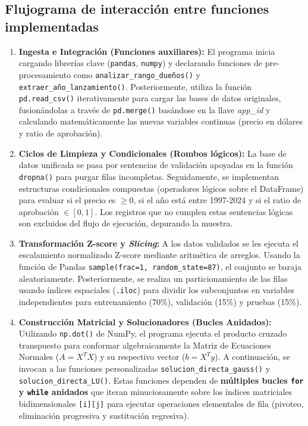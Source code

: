 \documentclass[12pt]{report}
\begin{document}
\subsection*{Flujograma de interacción entre funciones implementadas}

\begin{enumerate}
    \item \textbf{Ingesta e Integración (Funciones auxiliares):} El programa inicia cargando librerías clave (\texttt{pandas}, \texttt{numpy}) y declarando funciones de pre-procesamiento como \texttt{analizar\_rango\_dueños()} y \texttt{extraer\_año\_lanzamiento()}. Posteriormente, utiliza la función \texttt{pd.read\_csv()} iterativamente para cargar las bases de datos originales, fusionándolas a través de \texttt{pd.merge()} basándose en la llave \textit{app\_id} y calculando matemáticamente las nuevas variables continuas (precio en dólares y ratio de aprobación).
    \item \textbf{Ciclos de Limpieza y Condicionales (Rombos lógicos):} La base de datos unificada se pasa por sentencias de validación apoyadas en la función \texttt{dropna()} para purgar filas incompletas. Seguidamente, se implementan estructuras condicionales compuestas (operadores lógicos sobre el DataFrame) para evaluar si el precio es $\geq 0$, si el año está entre 1997-2024 y si el ratio de aprobación $\in [0, 1]$. Los registros que no cumplen estas sentencias lógicas son excluidos del flujo de ejecución, depurando la muestra.
    \item \textbf{Transformación Z-score y \textit{Slicing}:} A los datos validados se les ejecuta el escalamiento normalizado Z-score mediante aritmética de arreglos. Usando la función de Pandas \texttt{sample(frac=1, random\_state=87)}, el conjunto se baraja aleatoriamente. Posteriormente, se realiza un particionamiento de las filas usando índices espaciales (\texttt{.iloc}) para dividir los subconjuntos en variables independientes para entrenamiento (70\%), validación (15\%) y pruebas (15\%).
    \item \textbf{Construcción Matricial y Solucionadores (Bucles Anidados):} Utilizando \texttt{np.dot()} de NumPy, el programa ejecuta el producto cruzado transpuesto para conformar algebraicamente la Matriz de Ecuaciones Normales ($A = X^T X$) y su respectivo vector ($b = X^T y$). A continuación, se invocan a las funciones personalizadas \texttt{solucion\_directa\_gauss()} y \texttt{solucion\_directa\_LU()}. Estas funciones dependen de \textbf{múltiples bucles \texttt{for} y \texttt{while} anidados} que iteran minuciosamente sobre los índices matriciales bidimensionales \texttt{[i][j]} para ejecutar operaciones elementales de fila (pivoteo, eliminación progresiva y sustitución regresiva).

\end{enumerate}
\end{document}
